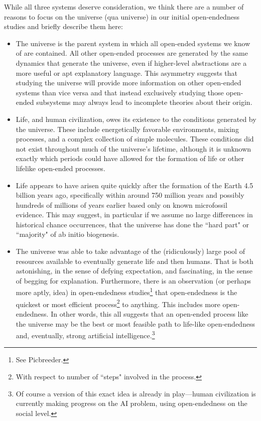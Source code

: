 \documentclass[12pt,letterpaper]{article}
\begin{document}
While all three systems deserve consideration, we think there are a number of reasons to focus on the universe (qua universe) in our initial open-endedness studies and briefly describe them here:
\begin{itemize}
\item The universe is the parent system in which all open-ended systems we know of are contained. All other open-ended processes are generated by the same dynamics that generate the universe, even if higher-level abstractions are a more useful or apt explanatory language. This asymmetry suggests that studying the universe will provide more information on other open-ended systems than vice versa and that instead exclusively studying those open-ended subsystems may always lead to incomplete theories about their origin.
\item Life, and human civilization, owes its existence to the conditions generated by the universe. These include energetically favorable environments, mixing processes, and a complex collection of simple molecules. These conditions did not exist throughout much of the universe's lifetime, although it is unknown exactly which periods could have allowed for the formation of life or other lifelike open-ended processes.
\item Life appears to have arisen quite quickly after the formation of the Earth 4.5 billion years ago, specifically within around 750 million years and possibly hundreds of millions of years earlier based only on known microfossil evidence. This may suggest, in particular if we assume no large differences in historical chance occurrences, that the universe has done the ``hard part" or ``majority" of ab initio biogenesis.
\item The universe was able to take advantage of the (ridiculously) large pool of resources available to eventually generate life and then humans. That is both astonishing, in the sense of defying expectation, and fascinating, in the sense of begging for explanation. Furthermore, there is an observation (or perhaps more aptly, idea) in open-endedness studies\footnote{See Picbreeder.} that open-endedness is the quickest or most efficient process\footnote{With respect to number of ``steps" involved in the process.} to anything. This includes more open-endedness. In other words, this all suggests that an open-ended process like the universe may be the best or most feasible path to life-like open-endedness and, eventually, strong artificial intelligence.\footnote{Of course a version of this exact idea is already in play---human civilization is currently making progress on the AI problem, using open-endedness on the social level.}

\end{itemize}
\end{document}
